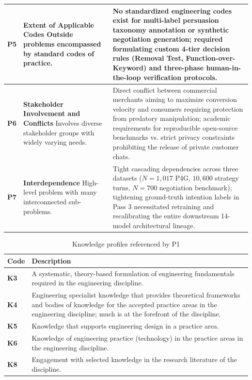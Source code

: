 \begin{table}[htbp]
\begin{tabularx}{\textwidth}{l>{\hsize}Y>{\hsize}Y}
    \midrule
    \textbf{P5} & \textbf{Extent of Applicable Codes} \newline Outside problems encompassed by standard codes of practice. & No standardized engineering codes exist for multi-label persuasion taxonomy annotation or synthetic negotiation generation; required formulating custom 4-tier decision rules (Removal Test, Function-over-Keyword) and three-phase human-in-the-loop verification protocols. \\
    \midrule
    \textbf{P6} & \textbf{Stakeholder Involvement and Conflicts} \newline Involves diverse stakeholder groups with widely varying needs. & Direct conflict between commercial merchants aiming to maximize conversion velocity and consumers requiring protection from predatory manipulation; academic requirements for reproducible open-source benchmarks vs. strict privacy constraints prohibiting the release of private customer chats. \\
    \midrule
    \textbf{P7} & \textbf{Interdependence} \newline High-level problem with many interconnected sub-problems. & Tight cascading dependencies across three datasets ($N=1{,}017$ P4G, $10{,}600$ strategy turns, $N=700$ negotiation benchmark); tightening ground-truth intention labels in Pass 3 necessitated retraining and recalibrating the entire downstream 14-model architectural lineage. \\
    \bottomrule
  \end{tabularx}
\end{table}

\begin{table}[htbp]
  \centering
  \small
  \caption{Knowledge profiles referenced by P1}
  \label{tab:knowledge-profile}
  \begin{tabularx}{\textwidth}{lY}
    \toprule
    \textbf{Code} & \textbf{Description} \\
    \midrule
    \textbf{K3} & A systematic, theory-based formulation of engineering fundamentals required in the engineering discipline. \\
    \textbf{K4} & Engineering specialist knowledge that provides theoretical frameworks and bodies of knowledge for the accepted practice areas in the engineering discipline; much is at the forefront of the discipline. \\
    \textbf{K5} & Knowledge that supports engineering design in a practice area. \\
    \textbf{K6} & Knowledge of engineering practice (technology) in the practice areas in the engineering discipline. \\
    \textbf{K8} & Engagement with selected knowledge in the research literature of the discipline. \\
    \bottomrule
  \end{tabularx}
\end{table}

